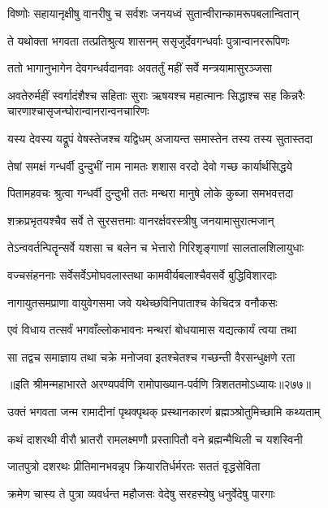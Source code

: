 \twolineshloka
{विष्णोः सहायानृक्षीषु वानरीषु च सर्वशः}
{जनयध्वं सुतान्वीरान्कामरूपबलान्वितान्}


\twolineshloka
{ते यथोक्ता भगवता तत्प्रतिश्रुत्य शासनम्}
{ससृजुर्देवगन्धर्वाः पुत्रान्वानररूपिणः}


\twolineshloka
{ततो भागानुभागेन देवगन्धर्वदानवाः}
{अवतर्तुं महीं सर्वे मन्त्रयामासुरञ्जसा}


\threelineshloka
{अवतेरुर्महीं स्वर्गादंशैश्च सहिताः सुराः}
{ऋषयश्च महात्मानः सिद्धाश्च सह किन्नरैः}
{चारणाश्चासृजन्घोरान्वानरान्वनचारिणः}


\twolineshloka
{यस्य देवस्य यद्रूपं वेषस्तेजश्च यद्विधम्}
{अजायन्त समास्तेन तस्य तस्य सुतास्तदा}


\twolineshloka
{तेषां समक्षं गन्धर्वी दुन्दुभीं नाम नामतः}
{शशास वरदो देवो गच्छ कार्यार्थसिद्धये}


\twolineshloka
{पितामहवचः श्रुत्वा गन्धर्वी दुन्दुभी ततः}
{मन्थरा मानुषे लोके कुब्जा समभवत्तदा}


\twolineshloka
{शक्रप्रभृतयश्चैव सर्वे ते सुरसत्तमाः}
{वानरर्क्षवरस्त्रीषु जनयामासुरात्मजान्}


\twolineshloka
{तेऽन्ववर्तन्पितॄन्सर्वे यशसा च बलेन च}
{भेत्तारो गिरिशृङ्गाणां सालतालशिलायुधाः}


\twolineshloka
{वज्चसंहननाः सर्वेसर्वेऽमोघवलास्तथा}
{कामवीर्यबलाश्चैवसर्वे बुद्धिविशारदाः}


\twolineshloka
{नागायुतसमप्राणा वायुवेगसमा जवे}
{यथेच्छविनिपाताश्च केचिदत्र वनौकसः}


\twolineshloka
{एवं विधाय तत्सर्वं भगवाँल्लोकभावनः}
{मन्थरां बोधयामास यद्यत्कार्यं त्वया तथा}


\twolineshloka
{सा तद्वच समाज्ञाय तथा चक्रे मनोजवा}
{इतश्चेतश्च गच्छन्ती वैरसन्धुक्षणे रता}


॥इति श्रीमन्महाभारते अरण्यपर्वणि रामोपाख्यान-पर्वणि त्रिशततमोऽध्यायः॥२७७॥



\twolineshloka
{उक्तं भगवता जन्म रामादीनां पृथक्पृथक्}
{प्रस्थानकारणं ब्रह्मञ्श्रोतुमिच्छामि कथ्यताम्}


\twolineshloka
{कथं दाशरथी वीरौ भ्रातरौ रामलक्ष्मणौ}
{प्रस्तापितौ वने ब्रह्मन्मैथिली च यशस्विनी}



\twolineshloka
{जातपुत्रो दशरथः प्रीतिमानभवन्नृप}
{क्रियारतिर्धर्मरतः सततं वृद्धसेविता}


\twolineshloka
{क्रमेण चास्य ते पुत्रा व्यवर्धन्त महौजसः}
{वेदेषु सरहस्येषु धनुर्वेदेषु पारगाः}


